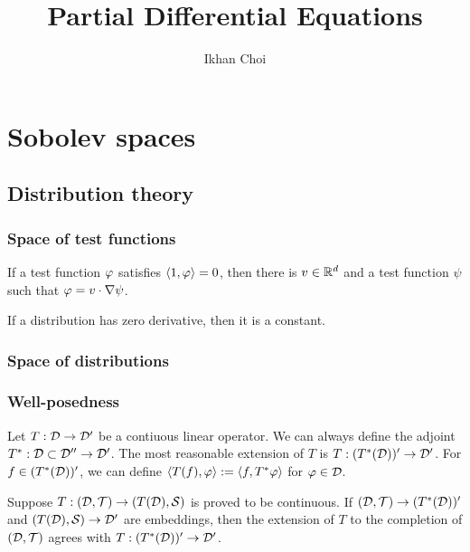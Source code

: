 \documentclass{../note}
\begin{document}
\title{Partial Differential Equations}
\author{Ikhan Choi}
\maketitle
\tableofcontents


\part{Sobolev spaces}

\chapter{Distribution theory}
\section{Space of test functions}
\begin{prb}
\begin{parts}
\item If a test function $\varphi$ satisfies $\langle1,\varphi\rangle=0$, then there is $v\in\mathbb{R}^d$ and a test function $\psi$ such that $\varphi=v\cdot\nabla\psi$.
\item If a distribution has zero derivative, then it is a constant.
\end{parts}
\end{prb}
\begin{prb}
\end{prb}

\section{Space of distributions}
\begin{prb}

\end{prb}


\section{Well-posedness}

\begin{prb}
Let $T:\mathcal{D}\to\mathcal{D}'$ be a contiuous linear operator.
We can always define the adjoint $T^*:\mathcal{D}\subset\mathcal{D}''\to\mathcal{D}'$.
The most reasonable extension of $T$ is $T:(T^*(\mathcal{D}))'\to\mathcal{D}'$.
For $f\in(T^*(\mathcal{D}))'$, we can define $\langle T(f),\varphi\rangle:=\langle f,T^*\varphi\rangle$ for $\varphi\in\mathcal{D}$.

Suppose $T:(\mathcal{D},\mathcal{T})\to(T(\mathcal{D}),\mathcal{S})$ is proved to be continuous.
If $(\mathcal{D},\mathcal{T})\to(T^*(\mathcal{D}))'$ and $(T(\mathcal{D}),\mathcal{S})\to\mathcal{D}'$ are embeddings, then the extension of $T$ to the completion of $(\mathcal{D},\mathcal{T})$ agrees with $T:(T^*(\mathcal{D}))'\to\mathcal{D}'$.
\end{prb}
\end{document}
